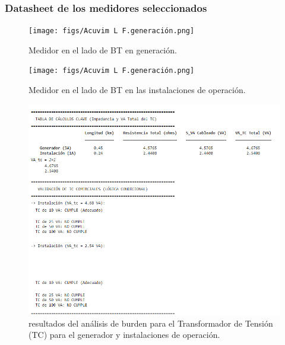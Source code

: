 \subsubsection{Datasheet de los medidores seleccionados}
\begin{figure}[H]
    \centering
    \texttt{[image: figs/Acuvim L F.generación.png]} %
    \caption{Medidor en el lado de BT en generación.}
    \label{fig:BT_gen}
\end{figure}
\begin{figure}[H]
    \centering
    \texttt{[image: figs/Acuvim L F.generación.png]} %
    \caption{Medidor en el lado de BT en las instalaciones de operación.}
    \label{fig:BT_carga}
\end{figure}



\begin{figure}[H]
    \centering
    \includegraphics[width=0.8\columnwidth]{figs/6 TC.png} %
    \caption{resultados del análisis de burden para el Transformador de Tensión (TC) para el generador y instalaciones de operación.}
    \label{fig:TC}
\end{figure}


